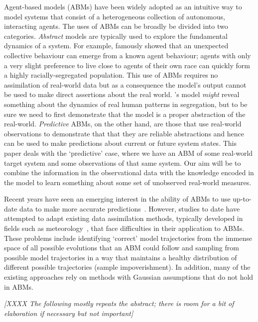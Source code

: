 \documentclass{article}
\begin{document}
Agent-based models (ABMs) have been widely adopted as an intuitive way to model systems that consist of a heterogeneous collection of autonomous, interacting agents. The uses of ABMs can be broadly be divided into two categories. \textit{Abstract} models are typically used to explore the fundamental dynamics of a system. For example, \citet{schelling1971dynamic} famously showed that an unexpected collective behaviour can emerge from a known agent behaviour; agents with only a very slight preference to live close to agents of their own race can quickly form a highly racially-segregated population. This use of ABMs requires no assimilation of real-world data but as a consequence the model's output cannot be used to make direct assertions about the real world. \citeauthor{schelling1971dynamic}'s model \textit{might} reveal something about the dynamics of real human patterns in segregation, but to be sure we need to first demonstrate that the model is a proper abstraction of the real-world. \textit{Predictive} ABMs, on the other hand, are those that use real-world observations to demonstrate that that they are reliable abstractions and hence can be used to make predictions about current or future system states. This paper deals with the `predictive' case, where we have an ABM of some real-world target system and some observations of that same system. Our aim will be to combine the information in the observational data with the knowledge encoded in the model to learn something about some set of unobserved real-world measures.

Recent years have seen an emerging interest in the ability of ABMs to use up-to-date data to make more accurate predictions~\citep[e.g.][]{wang_data_2015, lloyd_exploring_2016, ward_dynamic_2016, tang2019data, lueck_who_2019, tang2019osf, clay_realtime_2020, kieu_dealing_2020, malleson_simulating_2020}. However, studies to date have attempted to adapt existing data assimilation methods, typically developed in fields such as meteorology~\citep{kalnay_atmospheric_2003}, that face difficulties in their application to ABMs. These problems include identifying `correct' model trajectories from the immense space of all possible evolutions that an ABM could follow and sampling from possible model trajectories in a way that maintains a healthy distribution of different possible trajectories (sample impoverishment). In addition, many of the existing approaches rely on methods with Gaussian assumptions that do not hold in ABMs. 

\textit{[XXXX The following mostly repeats the abstract; there is room for a bit of elaboration if necessary but not important]}
\end{document}
